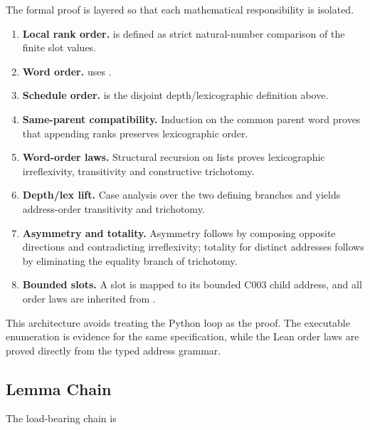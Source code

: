 The formal proof is layered so that each mathematical responsibility is
isolated.

\begin{enumerate}
\def\labelenumi{\arabic{enumi}.}
\tightlist
\item
  \textbf{Local rank order.} \texttt{\protect{}} is defined as
  strict natural-number comparison of the finite slot values.
\item
  \textbf{Word order.} \texttt{\protect{}} uses
  \texttt{\protect{}}.
\item
  \textbf{Schedule order.} \texttt{\protect{}} is the disjoint
  depth/lexicographic definition above.
\item
  \textbf{Same-parent compatibility.} Induction on the common parent
  word proves that appending ranks \texttt{\protect{}} preserves
  lexicographic order.
\item
  \textbf{Word-order laws.} Structural recursion on lists proves
  lexicographic irreflexivity, transitivity and constructive trichotomy.
\item
  \textbf{Depth/lex lift.} Case analysis over the two defining branches
  and \texttt{\protect{}} yields address-order transitivity and
  trichotomy.
\item
  \textbf{Asymmetry and totality.} Asymmetry follows by composing
  opposite directions and contradicting irreflexivity; totality for
  distinct addresses follows by eliminating the equality branch of
  trichotomy.
\item
  \textbf{Bounded slots.} A slot is mapped to its bounded C003 child
  address, and all order laws are inherited from \texttt{\protect{}}.
\end{enumerate}

This architecture avoids treating the Python loop as the proof. The
executable enumeration is evidence for the same specification, while the
Lean order laws are proved directly from the typed address grammar.

\subsection{Lemma Chain}\label{lemma-chain}

The load-bearing chain is

